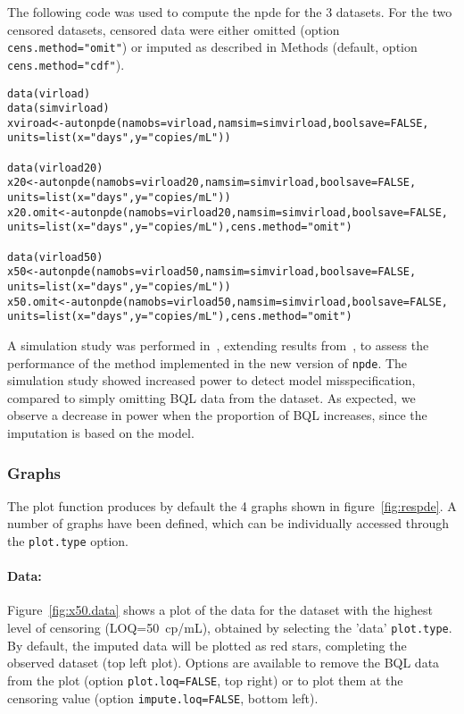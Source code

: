 \hskip 18pt The following code was used to compute the npde for the 3 datasets. For the two censored datasets, censored data were either omitted (option \texttt{cens.method="omit"}) or imputed as described in Methods (default, option \texttt{cens.method="cdf"}).

\begin{verbatim}
data(virload)
data(simvirload)
xviroad<-autonpde(namobs=virload,namsim=simvirload,boolsave=FALSE, 
units=list(x="days",y="copies/mL"))

data(virload20)
x20<-autonpde(namobs=virload20,namsim=simvirload,boolsave=FALSE, 
units=list(x="days",y="copies/mL"))
x20.omit<-autonpde(namobs=virload20,namsim=simvirload,boolsave=FALSE, 
units=list(x="days",y="copies/mL"),cens.method="omit")

data(virload50)
x50<-autonpde(namobs=virload50,namsim=simvirload,boolsave=FALSE, 
units=list(x="days",y="copies/mL"))
x50.omit<-autonpde(namobs=virload50,namsim=simvirload,boolsave=FALSE, 
units=list(x="days",y="copies/mL"),cens.method="omit")
\end{verbatim}

A simulation study was performed in~\cite{Nguyen2012}, extending results from~\cite{Nguyen2012}, to assess the performance of the method implemented in the new version of \texttt{npde}. The simulation study showed increased power to detect model misspecification, compared to simply omitting BQL data from the dataset. As expected, we observe a decrease in power when the proportion of BQL increases, since the imputation is based on the model.

\subsubsection{Graphs}

\hskip 18pt The plot function produces by default the 4 graphs shown in figure~\ref{fig:respde}. A number of graphs have been defined, which can be individually accessed through the \texttt{plot.type} option.

\paragraph{Data:} Figure~\ref{fig:x50.data} shows a plot of the data for the dataset with the highest level of censoring (LOQ=50~cp/mL), obtained by selecting the 'data' \texttt{plot.type}. By default, the imputed data will be plotted as red stars, completing the observed dataset (top left plot). Options are available to remove the BQL data from the plot (option \texttt{plot.loq=FALSE}, top right) or to plot them at the censoring value (option \texttt{impute.loq=FALSE}, bottom left). 

